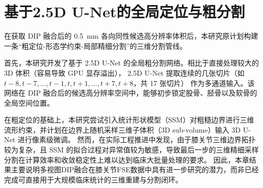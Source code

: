 \section{基于2.5D U-Net的全局定位与粗分割}
  在获取 DIP 融合后的 \qty{0.5}{\milli\metre} 各向同性候选高分辨率体积后，本研究原计划构建一条“粗定位-形态学约束-局部精细分割”的三维分割管线。
  \par 首先，本研究开发了基于 2.5D U-Net 的全局粗分割网络。相比于直接处理较大的 3D 体积（容易导致 GPU 显存溢出），
  2.5D U-Net 提取连续的几张切片（如 $t-8, t-7, \dots, t-1, t, t+1, \dots, t+7, t+8$，共 \num{17} 张切片）
  作为多通道输入。该网络在 DIP 融合后的候选高分辨率空间中，能够初步锁定股骨、胫骨以及软骨的全局空间位置。
  \par 在粗定位的基础上，本研究尝试引入统计形状模型（SSM）对粗糙边界进行三维流形约束，并计划在边界上随机采样三维子体积（3D sub-volume）输入 3D U-Net 进行像素级微调。
  然而，在实际工程推进中发现，由于膝关节三维边界拓扑较为复杂，且 SSM 的拟合过程对异常值较为敏感，导致最后一步的三维精细采样分割在计算效率和收敛稳定性上难以达到临床大批量处理的要求。
  因此，本章结果主要说明多视图DIP融合在膝关节FSE数据中具有进一步研究的潜力，而非已经完成可直接用于大规模临床统计的三维重建与分割闭环。
